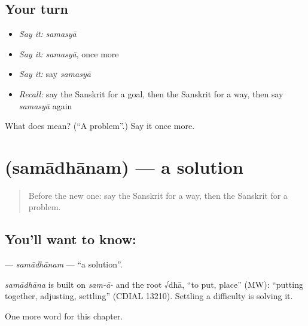 \subsection*{Your turn}
\begin{itemize}
\raggedright
  \item \emph{Say it:} \emph{samasyā}
  \item \emph{Say it:} \emph{samasyā}, once more
  \item \emph{Say it:} say \emph{samasyā}
  \item \emph{Recall:} say the Sanskrit for a goal, then the Sanskrit for a way, then say \emph{samasyā} again
\end{itemize}

\begin{tcolorbox}[breakable,colback=teal!4,colframe=teal!35!black,title={Before you move on}]
What does  mean? (\textquotedblleft{}A problem\textquotedblright{}.) Say it once more.
\end{tcolorbox}
\section[\texorpdfstring{\sk{समाधानम्} (samādhānam)}{समाधानम् (samādhānam)}]{ (samādhānam) — a solution}

\label{lesson:SA-C201-samadhanam}



\begin{quote}
Before the new one: say the Sanskrit for a way, then the Sanskrit for a problem.
\end{quote}

\subsection*{You'll want to know: }
\textbf{} — \emph{samādhānam} — \textquotedblleft{}a solution\textquotedblright{}.

\begin{cousinweb}
\emph{samādhāna} is built on \emph{sam-ā-} and the root √dhā, \textquotedblleft{}to put, place\textquotedblright{} (MW): \textquotedblleft{}putting together, adjusting, settling\textquotedblright{} (CDIAL 13210). Settling a difficulty is solving it.
\end{cousinweb}

\begin{grammarlens}[title={What you've built}]
One more word for this chapter.
\end{grammarlens}

